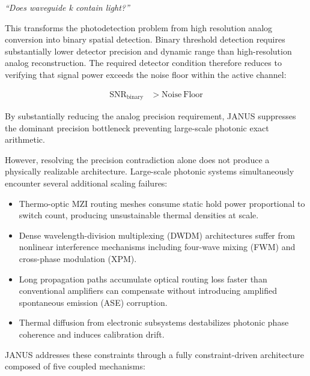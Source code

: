 \documentclass[journal]{IEEEtran}
\begin{document}
\begin{center}
\textit{``Does waveguide k contain light?''}
\end{center}

This transforms the photodetection problem from high resolution analog conversion into binary spatial detection. Binary threshold detection requires substantially lower detector precision and dynamic range than high-resolution analog reconstruction. The required detector condition therefore reduces to verifying that signal power exceeds the noise floor within the active channel:

\begin{align}
\mathrm{SNR}_{\mathrm{binary}}
&>
\mathrm{Noise\ Floor}
\label{eq:binary_requirement}
\end{align}

By substantially reducing the analog precision requirement, JANUS suppresses the dominant precision bottleneck preventing large-scale photonic exact arithmetic.

However, resolving the precision contradiction alone does not produce a physically realizable architecture. Large-scale photonic systems simultaneously encounter several additional scaling failures:

\begin{itemize}
\item  Thermo-optic MZI routing meshes consume static hold power proportional to switch count, producing unsustainable thermal densities at scale.
\item  Dense wavelength-division multiplexing (DWDM) architectures suffer from nonlinear interference mechanisms including four-wave mixing (FWM) and cross-phase modulation (XPM).
\item  Long propagation paths accumulate optical routing loss faster than conventional amplifiers can compensate without introducing amplified spontaneous emission (ASE) corruption.
\item  Thermal diffusion from electronic subsystems destabilizes photonic phase coherence and induces calibration drift.
\end{itemize}

JANUS addresses these constraints through a fully constraint-driven architecture composed of five coupled mechanisms:
\end{document}

